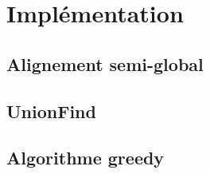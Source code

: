 \section{Implémentation}


\subsection{Alignement semi-global}

\subsection{UnionFind}

\subsection{Algorithme greedy}
